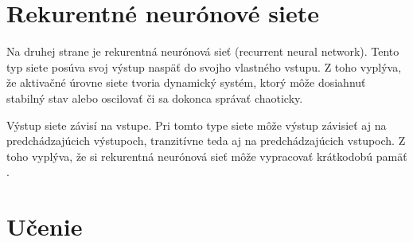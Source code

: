 \section{Rekurentné neurónové siete}
Na druhej strane je rekurentná neurónová sieť (recurrent neural network).
Tento typ siete posúva svoj výstup naspäť do svojho vlastného vstupu. 
Z toho vyplýva, že aktivačné úrovne siete tvoria dynamický systém, ktorý môže dosiahnuť stabilný stav alebo oscilovať či sa dokonca správať chaoticky.

Výstup siete závisí na vstupe. 
Pri tomto type siete môže výstup závisieť aj na predchádzajúcich výstupoch, tranzitívne teda aj na predchádzajúcich vstupoch.
Z toho vyplýva, že si rekurentná neurónová sieť môže vypracovať krátkodobú pamäť \citep{aima}.

\section{Učenie}
